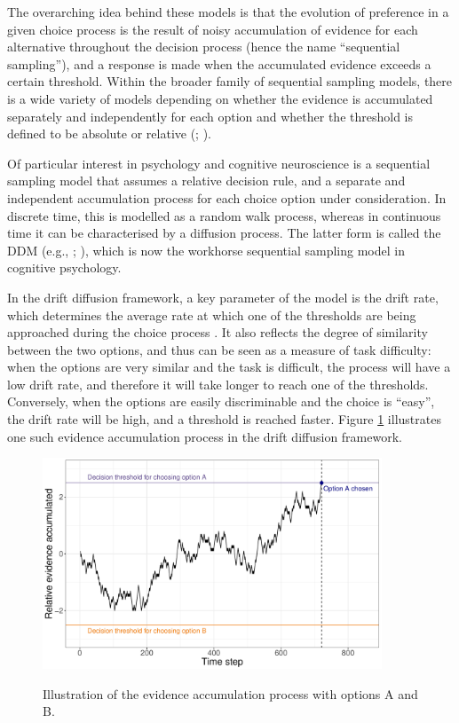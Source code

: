 \documentclass[11pt,a4paper]{article}
\begin{document}
The overarching idea behind these models is that the evolution of preference in a given choice process is the result of noisy accumulation of evidence for each alternative throughout the decision process (hence the name “sequential sampling”), and a response is made when the accumulated evidence exceeds a certain threshold. Within the broader family of sequential sampling models, there is a wide variety of models depending on whether the evidence is accumulated separately and independently for each option and whether the threshold is defined to be absolute or relative (; ).

Of particular interest in psychology and cognitive neuroscience is a sequential sampling model that assumes a relative decision rule, and a separate and independent accumulation process for each choice option under consideration. In discrete time, this is modelled as a random walk process, whereas in continuous time it can be characterised by a diffusion process. The latter form is called the DDM (e.g., ; ), which is now the workhorse sequential sampling model in cognitive psychology. 

In the drift diffusion framework, a key parameter of the model is the drift rate, which determines the average rate at which one of the thresholds are being approached during the choice process \cite{Voss2004a}. It also reflects the degree of similarity between the two options, and thus can be seen as a measure of task difficulty: when the options are very similar and the task is difficult, the process will have a low drift rate, and therefore it will take longer to reach one of the thresholds. Conversely, when the options are easily discriminable and the choice is ``easy'', the drift rate will be high, and a threshold is reached faster. Figure \ref{fig:randomwalk} illustrates one such evidence accumulation process in the drift diffusion framework.

\begin{figure}[h]
\centering
\caption{Illustration of the evidence accumulation process with options A and
B.}
\includegraphics[width=0.9\textwidth]{./c1_randomwalk.pdf}
\label{fig:randomwalk}
\end{figure}
\end{document}
